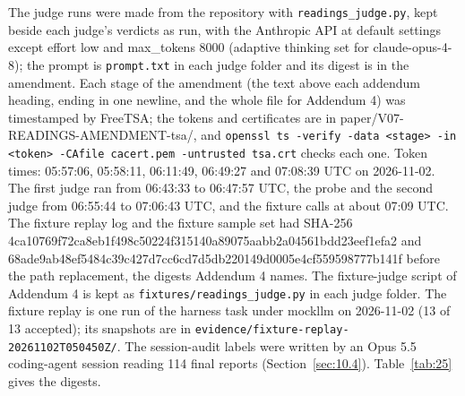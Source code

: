 \documentclass[11pt]{article}
\begin{document}
The judge runs were made from the repository with \texttt{readings\_judge.py}, kept beside each judge's verdicts as run, with the Anthropic API at default settings except effort low and max\_tokens 8000 (adaptive thinking set for claude-opus-4-8); the prompt is \texttt{prompt.txt} in each judge folder and its digest is in the amendment. Each stage of the amendment (the text above each addendum heading, ending in one newline, and the whole file for Addendum 4) was timestamped by FreeTSA; the tokens and certificates are in paper/V07-READINGS-AMENDMENT-tsa/, and \texttt{openssl ts -verify -data <stage> -in <token> -CAfile cacert.pem -untrusted tsa.crt} checks each one. Token times: 05:57:06, 05:58:11, 06:11:49, 06:49:27 and 07:08:39 UTC on 2026-11-02. The first judge ran from 06:43:33 to 06:47:57 UTC, the probe and the second judge from 06:55:44 to 07:06:43 UTC, and the fixture calls at about 07:09 UTC. The fixture replay log and the fixture sample set had SHA-256 4ca10769f72ca8eb1f498c50224f315140a89075aabb2a04561bdd23eef1efa2 and 68ade9ab48ef5484c39c427d7cc6cd7d5db220149d0005e4cf559598777b141f before the path replacement, the digests Addendum 4 names. The fixture-judge script of Addendum 4 is kept as \texttt{fixtures/readings\_judge.py} in each judge folder. The fixture replay is one run of the harness task under mockllm on 2026-11-02 (13 of 13 accepted); its snapshots are in \texttt{evidence/fixture-replay-20261102T050450Z/}. The session-audit labels were written by an Opus 5.5 coding-agent session reading 114 final reports (Section~\ref{sec:10.4}). Table~\ref{tab:25} gives the digests.
\end{document}
